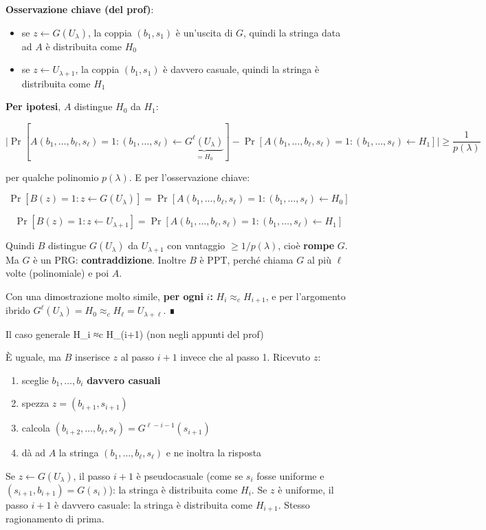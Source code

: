 \textbf{Osservazione chiave (del prof)}:

\begin{itemize}
\tightlist
\item
  se \(z \leftarrow G(U_\lambda)\), la coppia \((b_1, s_1)\) è un'uscita di \(G\), quindi la stringa data ad \(A\) è distribuita come \(H_0\)
\item
  se \(z \leftarrow U_{\lambda+1}\), la coppia \((b_1, s_1)\) è davvero casuale, quindi la stringa è distribuita come \(H_1\)
\end{itemize}

\textbf{Per ipotesi}, \(A\) distingue \(H_0\) da \(H_1\):

\[
\Big| \Pr[A(b_1, \dots, b_\ell, s_\ell) = 1 : (b_1, \dots, s_\ell) \leftarrow \underbrace{G^\ell(U_\lambda)}_{= H_0}] - \Pr[A(b_1, \dots, b_\ell, s_\ell) = 1 : (b_1, \dots, s_\ell) \leftarrow H_1] \Big| \ge \frac{1}{p(\lambda)}
\]

per qualche polinomio \(p(\lambda)\). E per l'osservazione chiave:

\[
\Pr[B(z) = 1 : z \leftarrow G(U_\lambda)] = \Pr[A(b_1, \dots, b_\ell, s_\ell) = 1 : (b_1, \dots, s_\ell) \leftarrow H_0]
\]

\[
\Pr[B(z) = 1 : z \leftarrow U_{\lambda+1}] = \Pr[A(b_1, \dots, b_\ell, s_\ell) = 1 : (b_1, \dots, s_\ell) \leftarrow H_1]
\]

Quindi \(B\) distingue \(G(U_\lambda)\) da \(U_{\lambda+1}\) con vantaggio \(\ge 1/p(\lambda)\), cioè \textbf{rompe} \(G\). Ma \(G\) è un PRG: \textbf{contraddizione}. Inoltre \(B\) è PPT, perché chiama \(G\) al più \(\ell\) volte (polinomiale) e poi \(A\).

Con una dimostrazione molto simile, \textbf{per ogni} \(i\)\textbf{:} \(H_i \approx_c H_{i+1}\), e per l'argomento ibrido \(G^\ell(U_\lambda) = H_0 \approx_c H_\ell = U_{\lambda+\ell}\). ∎

\begin{approfondimento}{Il caso generale H\_i ≈c H\_(i+1) (non negli appunti del prof)}

È uguale, ma \(B\) inserisce \(z\) al passo \(i+1\) invece che al passo 1. Ricevuto \(z\):

\begin{enumerate}
\def\labelenumi{\arabic{enumi}.}
\tightlist
\item
  sceglie \(b_1, \dots, b_i\) \textbf{davvero casuali}
\item
  spezza \(z = (b_{i+1}, s_{i+1})\)
\item
  calcola \((b_{i+2}, \dots, b_\ell, s_\ell) = G^{\ell-i-1}(s_{i+1})\)
\item
  dà ad \(A\) la stringa \((b_1, \dots, b_\ell, s_\ell)\) e ne inoltra la risposta
\end{enumerate}

Se \(z \leftarrow G(U_\lambda)\), il passo \(i+1\) è pseudocasuale (come se \(s_i\) fosse uniforme e \((s_{i+1}, b_{i+1}) = G(s_i)\)): la stringa è distribuita come \(H_i\). Se \(z\) è uniforme, il passo \(i+1\) è davvero casuale: la stringa è distribuita come \(H_{i+1}\). Stesso ragionamento di prima.

\end{approfondimento}

